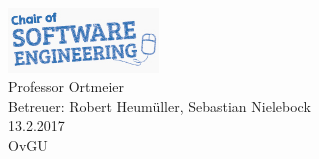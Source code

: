 \begin{center}
\includegraphics[width = 40mm]{cse.png}\\
{\large
Professor Ortmeier\\
Betreuer: Robert Heumüller, Sebastian Nielebock\\
13.2.2017\\
OvGU}
\end{center}
\thispagestyle{empty}
\newpage
\setcounter{page}{1}
